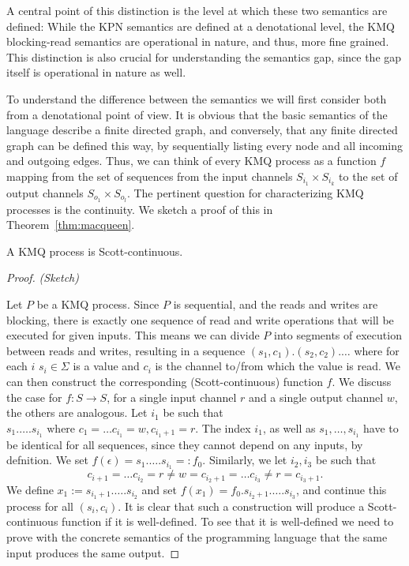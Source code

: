 A central point of this distinction is the level at which these two semantics are defined:
While the \ac{KPN} semantics are defined at a denotational level, the \ac{KMQ} blocking-read semantics are operational in nature, and thus, more fine grained.
This distinction is also crucial for understanding the semantics gap, since the gap itself is operational in nature as well. 

To understand the difference between the semantics we will first consider both from a denotational point of view. It is obvious that the basic semantics of the language describe a finite directed graph, and conversely, that any finite directed graph can be defined this way, by sequentially listing every node and all incoming and outgoing edges.
Thus, we can think of every \ac{KMQ} process as a function $f$ mapping from the set of sequences from the input channels $S_{i_1} \times S_{i_k}$ to the set of output channels $S_{o_1} \times S_{o_l}$.
The pertinent question for characterizing \ac{KMQ} processes is the continuity. We sketch a proof of this in Theorem~\ref{thm:macqueen}.

\begin{theorem}
\label{thm:macqueen}
A \ac{KMQ} process is Scott-continuous.
\begin{proof}\emph{(Sketch)}

Let $P$ be a \ac{KMQ} process.
Since $P$ is sequential, and the reads and writes are blocking, there is exactly one sequence of read and write operations that will be executed for given inputs.
This means we can divide $P$ into segments of execution between reads and writes, resulting in a sequence $(s_1,c_1).(s_2,c_2).\ldots$ where for each $i$ $s_i \in \Sigma$ is a value and $c_i$ is the channel to/from which the value is read. 
We can then construct the corresponding (Scott-continuous) function $f$.
We discuss the case for $f : S \rightarrow S$, for a single input channel $r$ and a single output channel $w$, the others are analogous.
Let $i_1$ be such that $s_1.\ldots.s_{i_1} \text{ where } c_1 = \ldots c_{i_1} = w, c_{i_1+1} = r$.
The index $i_1$, as well as $s_1,\ldots,s_{i_1}$ have to be identical for all sequences, since they cannot depend on any inputs, by defnition.
We set $f(\epsilon) = s_1.\ldots.s_{i_1} =: f_0$.
Similarly,  we let $i_2,i_3$ be such that  \[c_{i+1} = \ldots c_{i_2} = r \neq w = c_{i_2+1} = \ldots c_{i_3} \neq r = c_{i_3+1}.\]
We define $x_1 := s_{i_1 + 1}.\ldots.s_{i_2}$ and set $f(x_1) = f_0.s_{i_2+1}.\ldots.s_{i_3}$, and continue this process for all $(s_i,c_i)$.
It is clear that such a construction will produce a Scott-continuous function if it is well-defined.
To see that it is well-defined we need to prove with the concrete semantics of the programming language that the same input produces the same output.
\end{proof}
\end{theorem}

